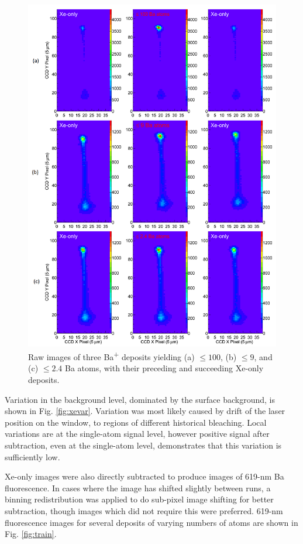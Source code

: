\begin{figure} %
        \centering
                \includegraphics[width=.95\textwidth]{figures/xebaxe.png}
                \caption{Raw images of three Ba\textsuperscript{+} deposits yielding (a) $\leq 100$, (b) $\leq 9$, and (c) $\leq 2.4$ Ba atoms, with their preceding and succeeding Xe-only deposits.}
\label{fig:xebaxe}
\end{figure}

Variation in the background level, dominated by the surface background, is shown in Fig. \ref{fig:xevar}.  Variation was most likely caused by drift of the laser position on the window, to regions of different historical bleaching.  Local variations are at the single-atom signal level, however positive signal after subtraction, even at the single-atom level, demonstrates that this variation is sufficiently low.

Xe-only images were also directly subtracted to produce images of 619-nm Ba fluorescence.  In cases where the image has shifted slightly between runs, a binning redistribution was applied to do sub-pixel image shifting for better subtraction, though images which did not require this were preferred.  619-nm fluorescence images for several deposits of varying numbers of atoms are shown in Fig. \ref{fig:train}.  

